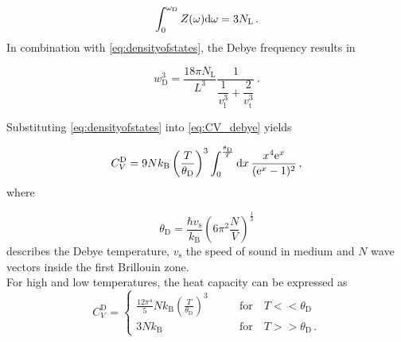 \begin{equation*}
    \int^{\omega_\text{D}}_0 Z(\omega) \mathrm{d} \omega = 3 N_\text{L} \,. 
\end{equation*}
In combination with \eqref{eq:densityofstates}, the Debye frequency results in

\begin{equation}
    w^{3}_\text{D} = \dfrac{18 \pi N_\text{L}}{L^3}\dfrac{1}{\dfrac{1}{v^{3}_\text{l}} + \dfrac{2}{v^{3}_\text{t} }} \,.
    \label{eq:Debye_frequency}
\end{equation}


Substituting \eqref{eq:densityofstates} into \eqref{eq:CV_debye} yields

\begin{equation*}
    C^\text{D}_V = 9 N k_\text{B} \left( \frac{T}{\theta_\text{D}} \right)^3 \int^{\frac{\theta_\text{D}}{T}}_0 \mathrm{d} x \, \frac{x^4 \text{e}^x}{(\text{e}^x -1)^2} \,,
\end{equation*}
where

\begin{equation*}
    \theta_\text{D} = \frac{\hbar v_\text{s}}{k_\text{B}} \left(6 \pi^2 \frac{N}{V}\right)^{\frac{1}{3}}
\end{equation*}
describes the Debye temperature, $v_\text{s}$ the speed of sound in medium and $N$ wave vectors inside the first Brillouin zone. \\

For high and low temperatures, the heat capacity can be expressed as
\begin{equation*}
    C^\text{D}_V= \begin{cases}
        \frac{12 \pi^4}{5} N k_\text{B} \left(\frac{T} {\theta_\text{D}}\right)^3 &\qquad \text{for} \quad T << \theta_\text{D} \\ 
        3 N k_\text{B} &\qquad \text{for} \quad T >> \theta_\text{D} \,.
    \end{cases} 
\end{equation*}